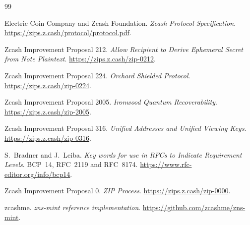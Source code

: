 \documentclass[11pt]{article}
\begin{document}





\begin{thebibliography}{99}

Electric Coin Company and Zcash Foundation.
\emph{Zcash Protocol Specification}.
\url{https://zips.z.cash/protocol/protocol.pdf}.

Zcash Improvement Proposal 212.
\emph{Allow Recipient to Derive Ephemeral Secret from Note Plaintext}.
\url{https://zips.z.cash/zip-0212}.

Zcash Improvement Proposal 224.
\emph{Orchard Shielded Protocol}.
\url{https://zips.z.cash/zip-0224}.

Zcash Improvement Proposal 2005.
\emph{Ironwood Quantum Recoverability}.
\url{https://zips.z.cash/zip-2005}.

Zcash Improvement Proposal 316.
\emph{Unified Addresses and Unified Viewing Keys}.
\url{https://zips.z.cash/zip-0316}.

S.~Bradner and J.~Leiba.
\emph{Key words for use in RFCs to Indicate Requirement Levels}.
BCP~14, RFC~2119 and RFC~8174.
\url{https://www.rfc-editor.org/info/bcp14}.

Zcash Improvement Proposal 0.
\emph{ZIP Process}.
\url{https://zips.z.cash/zip-0000}.

zcashme.
\emph{zns-mint reference implementation}.
\url{https://github.com/zcashme/zns-mint}.

\end{thebibliography}
\end{document}
